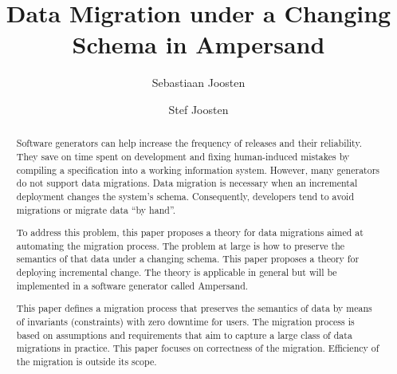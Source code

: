 \documentclass[runningheads]{llncs}
\begin{document}
%

\title{Data Migration under a Changing Schema in Ampersand}
%
%
\author{Sebastiaan Joosten\\ \and
Stef Joosten}
%
%
%
\maketitle              %
%
\begin{abstract}
   Software generators can help increase the frequency of releases and their reliability.
   They save on time spent on development and fixing human-induced mistakes by compiling a specification into a working information system.
   However, many generators do not support data migrations.
   Data migration is necessary when an incremental deployment changes the system's schema.
   Consequently, developers tend to avoid migrations or migrate data ``by hand''.

   To address this problem, this paper proposes a theory for data migrations aimed at automating the migration process.
   The problem at large is how to preserve the semantics of that data under a changing schema.
   This paper proposes a theory for deploying incremental change.
   The theory is applicable in general but will be implemented in a software generator called Ampersand.

   This paper defines a migration process that preserves the semantics of data by means of invariants (constraints)
   with zero downtime for users.
   The migration process is based on assumptions and requirements that aim to capture a large class of data migrations in practice.
   This paper focuses on correctness of the migration. Efficiency of the migration is outside its scope.
\end{abstract}
\end{document}
